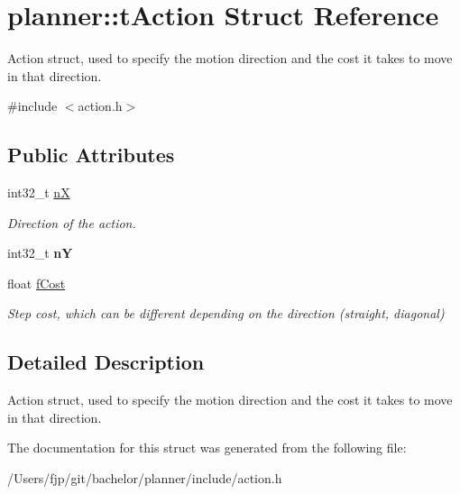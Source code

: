 \hypertarget{structplanner_1_1t_action}{}\section{planner\+:\+:t\+Action Struct Reference}
\label{structplanner_1_1t_action}


Action struct, used to specify the motion direction and the cost it takes to move in that direction.  




{\ttfamily \#include $<$action.\+h$>$}

\subsection*{Public Attributes}
\begin{DoxyCompactItemize}
\item 
\mbox{\label{structplanner_1_1t_action_a6fe9c52bafa62b4f8349ff4cfcc3885f}} 
int32\+\_\+t \mbox{\hyperlink{structplanner_1_1t_action_a6fe9c52bafa62b4f8349ff4cfcc3885f}{nX}}
\begin{DoxyCompactList}\small\item\em Direction of the action. \end{DoxyCompactList}\item 
\mbox{\label{structplanner_1_1t_action_a7b2097903797ca6c0a5ca26643139740}} 
int32\+\_\+t {\bfseries nY}
\item 
\mbox{\label{structplanner_1_1t_action_ad90ddd244d8eb12cb6460797755e8b07}} 
float \mbox{\hyperlink{structplanner_1_1t_action_ad90ddd244d8eb12cb6460797755e8b07}{f\+Cost}}
\begin{DoxyCompactList}\small\item\em Step cost, which can be different depending on the direction (straight, diagonal) \end{DoxyCompactList}\end{DoxyCompactItemize}


\subsection{Detailed Description}
Action struct, used to specify the motion direction and the cost it takes to move in that direction. 

The documentation for this struct was generated from the following file\+:\begin{DoxyCompactItemize}
\item 
/\+Users/fjp/git/bachelor/planner/include/action.\+h\end{DoxyCompactItemize}

